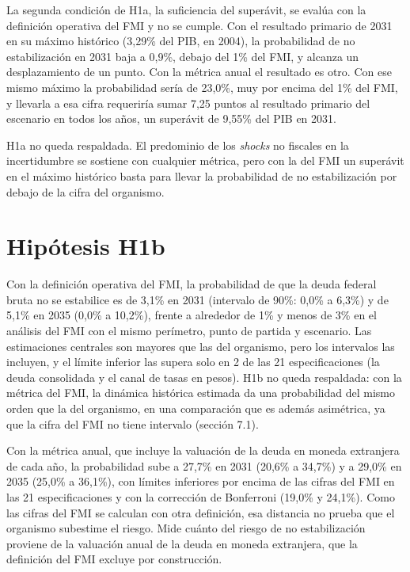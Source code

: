 La segunda condición de H1a, la suficiencia del superávit, se evalúa con
la definición operativa del FMI y no se cumple. Con el resultado
primario de 2031 en su máximo histórico (3,29\% del PIB, en 2004), la
probabilidad de no estabilización en 2031 baja a 0,9\%, debajo del 1\%
del FMI, y alcanza un desplazamiento de un punto. Con la métrica anual
el resultado es otro. Con ese mismo máximo la probabilidad sería de
23,0\%, muy por encima del 1\% del FMI, y llevarla a esa cifra
requeriría sumar 7,25 puntos al resultado primario del escenario en
todos los años, un superávit de 9,55\% del PIB en 2031.

H1a no queda respaldada. El predominio de los \emph{shocks} no fiscales
en la incertidumbre se sostiene con cualquier métrica, pero con la del
FMI un superávit en el máximo histórico basta para llevar la
probabilidad de no estabilización por debajo de la cifra del organismo.

\section{Hipótesis H1b}

Con la definición operativa del FMI, la probabilidad de que la deuda
federal bruta no se estabilice es de 3,1\% en 2031 (intervalo de 90\%:
0,0\% a 6,3\%) y de 5,1\% en 2035 (0,0\% a 10,2\%), frente a alrededor
de 1\% y menos de 3\% en el análisis del FMI con el mismo perímetro,
punto de partida y escenario. Las estimaciones centrales son mayores que
las del organismo, pero los intervalos las incluyen, y el límite
inferior las supera solo en 2 de las 21 especificaciones (la deuda
consolidada y el canal de tasas en pesos). H1b no queda respaldada: con
la métrica del FMI, la dinámica histórica estimada da una probabilidad
del mismo orden que la del organismo, en una comparación que es además
asimétrica, ya que la cifra del FMI no tiene intervalo (sección 7.1).

Con la métrica anual, que incluye la valuación de la deuda en moneda
extranjera de cada año, la probabilidad sube a 27,7\% en 2031 (20,6\% a
34,7\%) y a 29,0\% en 2035 (25,0\% a 36,1\%), con límites inferiores por
encima de las cifras del FMI en las 21 especificaciones y con la
corrección de Bonferroni (19,0\% y 24,1\%). Como las cifras del FMI se
calculan con otra definición, esa distancia no prueba que el organismo
subestime el riesgo. Mide cuánto del riesgo de no estabilización
proviene de la valuación anual de la deuda en moneda extranjera, que la
definición del FMI excluye por construcción.

